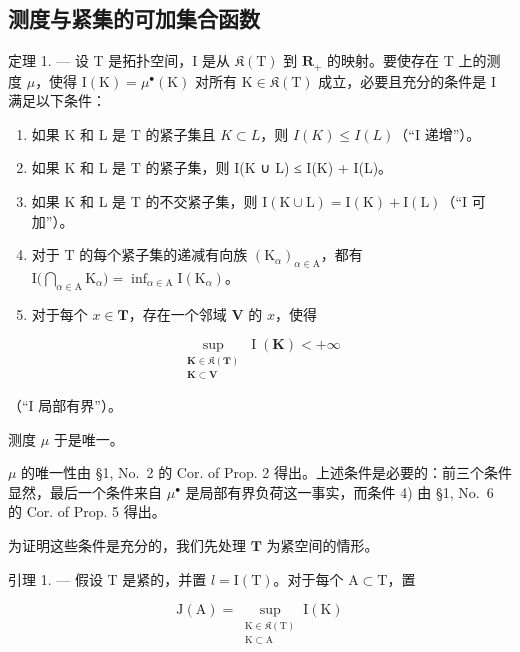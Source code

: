 \subsection{测度与紧集的可加集合函数}

定理 1. --- 设 T 是拓扑空间，I 是从 \(\mathfrak{K}(\mathrm{T})\) 到 \(\mathbf{R}_{+}\) 的映射。要使存在 T 上的测度 \(\mu\)，使得 \(\mathrm{I}(\mathrm{K}) = \mu^{\bullet}(\mathrm{K})\) 对所有 \(\mathrm{K} \in \mathfrak{K}(\mathrm{T})\) 成立，必要且充分的条件是 I 满足以下条件：

\begin{enumerate}
\def\labelenumi{\arabic{enumi})}
\item
  如果 K 和 L 是 T 的紧子集且 \(K \subset L\)，则 \(I(K) \leqslant I(L)\)（“I 递增”）。
\item
  如果 K 和 L 是 T 的紧子集，则 I(K ∪ L) ≤ I(K) + I(L)。
\item
  如果 K 和 L 是 T 的不交紧子集，则 \(\mathrm{I}(\mathrm{K}\cup\mathrm{L})=\mathrm{I}(\mathrm{K})+\mathrm{I}(\mathrm{L})\)（“I 可加”）。
\item
  对于 T 的每个紧子集的递减有向族 \((\mathrm{K}_{\alpha})_{\alpha \in \mathrm{A}}\)，都有 \(\mathrm{I}\big(\bigcap_{\alpha \in \mathrm{A}}\mathrm{K}_{\alpha}\big) = \inf_{\alpha \in \mathrm{A}}\mathrm{I}(\mathrm{K}_{\alpha})\)。
\item
  对于每个 \(x \in \mathbf{T}\)，存在一个邻域 \(\mathbf{V}\) 的 \(x\)，使得
\end{enumerate}

\[
\sup_{\substack{\mathbf{K}\in \mathfrak{K}(\mathbf{T})\\ \mathbf{K}\subset \mathbf{V}}}\operatorname{I}(\mathbf{K}) <   + \infty
\]

（“I 局部有界”）。

测度 \(\mu\) 于是唯一。

\(\mu\) 的唯一性由 §1, No.~2 的 Cor. of Prop. 2 得出。上述条件是必要的：前三个条件显然，最后一个条件来自 \(\mu^{\bullet}\) 是局部有界负荷这一事实，而条件 4) 由 §1, No.~6 的 Cor. of Prop. 5 得出。

为证明这些条件是充分的，我们先处理 \(\mathbf{T}\) 为紧空间的情形。

引理 1. --- 假设 T 是紧的，并置 \(l = \mathrm{I}(\mathrm{T})\)。对于每个 \(\mathrm{A} \subset \mathrm{T}\)，置

\[
\mathrm{J}(\mathrm{A}) = \sup_{\substack{\mathrm{K}\in \mathfrak{K}(\mathrm{T})\\ \mathrm{K}\subset \mathrm{A}}}\mathrm{I}(\mathrm{K})\tag{1}
\]

